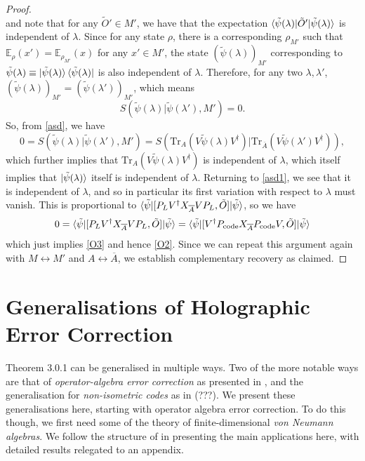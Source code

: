 \documentclass[12pt,a4paper]{report}
\numberwithin{equation}{section}
\newcommand{\ketbra}[2]{\ket{#1}\bra{#2}}
\newcommand{\ketbras}[1]{\ketbra{#1}{#1}}
\newcommand{\Pc}{P_{\text{code}}}
\newcommand{\ol}[1]{\overline{#1}}
\newcommand{\tr}{\text{Tr}}
\theoremstyle{definition}
\theoremstyle{theorem}
\theoremstyle{theorem}
\theoremstyle{example}
\theoremstyle{definition}
\begin{document}
\begin{proof}
\begin{equation}
	\end{equation}
	and note that for any $\tilde{O}'\in M'$, we have that the expectation $\braket{\tilde{\psi}(\lambda)|\tilde{O}'|\tilde{\psi}(\lambda)}$ is independent of $\lambda$. Since for any state $\rho$, there is a corresponding $\rho_{M'}$ such that $\mathbb{E}_{\rho}(x')=\mathbb{E}_{\rho_{M'}}(x)$ for any $x'\in M'$, the state $(\tilde{\psi}(\lambda))_{M'}$ corresponding to $\tilde{\psi}(\lambda)\equiv\ketbras{\tilde{\psi}(\lambda)}$ is also independent of $\lambda$. Therefore, for any two $\lambda,\lambda'$, $(\tilde{\psi}(\lambda))_{M'}=(\tilde{\psi}(\lambda'))_{M'}$, which means
	\begin{equation}
		S(\tilde{\psi}(\lambda)|\tilde{\psi}(\lambda'),M')=0.
	\end{equation}
	So, from \ref{asd}, we have
	\begin{equation}
		0=S(\tilde{\psi}(\lambda)|\tilde{\psi}(\lambda'),M')=S(\tr_{{A}}(V\tilde{\psi}(\lambda) V^{\dagger})|\tr_{\ol{A}}(V\tilde{\psi}(\lambda') V^{\dagger})),
	\end{equation}
	which further implies that $\tr_{A}(V\tilde{\psi}(\lambda)V^{\dagger})$ is independent of $\lambda$, which itself implies that $\ket{\tilde{\psi}(\lambda)}$ itself is independent of $\lambda$. Returning to \ref{asd1}, we see that it is independent of $\lambda$, and so in particular its first variation with respect to $\lambda$ must vanish. This is proportional to $\braket{\tilde{\psi}|[P_{L}V^{\dagger}X_{\ol{A}}VP_{L},\tilde{O}]|\tilde{\psi}}$, so we have
	\begin{equation}
		0=\braket{\tilde{\psi}|[P_{L}V^{\dagger}X_{\ol{A}}VP_{L},\tilde{O}]|\tilde{\psi}}=\braket{\tilde{\psi}|[V^{\dagger}\Pc X_{\ol{A}}\Pc V,\tilde{O}]|\tilde{\psi}}
	\end{equation}
	which just implies \ref{O3} and hence \ref{O2}. Since we can repeat this argument again with $M\leftrightarrow M'$ and $A\leftrightarrow \ol{A}$, we establish complementary recovery as claimed.
\end{proof}

\chapter{Generalisations of Holographic Error Correction}
Theorem 3.0.1 can be generalised in multiple ways. Two of the more notable ways are that of \textit{operator-algebra error correction} as presented in \cite{Harlow}, and the generalisation for \textit{non-isometric codes} as in (???). We present these generalisations here, starting with operator algebra error correction. To do this though, we first need some of the theory of finite-dimensional \textit{von Neumann algebras}. We follow the structure of \cite{Harlow} in presenting the main applications here, with detailed results relegated to an appendix.
\end{document}
